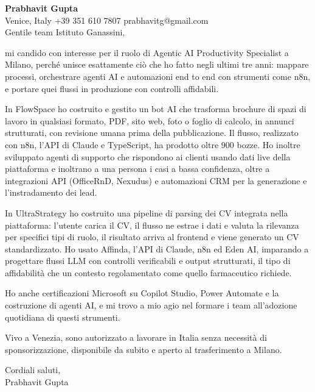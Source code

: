 \documentclass[a4paper,10.5pt]{article}
\begin{document}
\textbf{Prabhavit Gupta}\\
Venice, Italy \textbar{} +39 351 610 7807 \textbar{} prabhavitg@gmail.com\\[10pt]
Gentile team Istituto Ganassini,

mi candido con interesse per il ruolo di Agentic AI Productivity Specialist a Milano, perch\'e unisce esattamente ci\`o che ho fatto negli ultimi tre anni: mappare processi, orchestrare agenti AI e automazioni end to end con strumenti come n8n, e portare quei flussi in produzione con controlli affidabili.

In FlowSpace ho costruito e gestito un bot AI che trasforma brochure di spazi di lavoro in qualsiasi formato, PDF, sito web, foto o foglio di calcolo, in annunci strutturati, con revisione umana prima della pubblicazione. Il flusso, realizzato con n8n, l'API di Claude e TypeScript, ha prodotto oltre 900 bozze. Ho inoltre sviluppato agenti di supporto che rispondono ai clienti usando dati live della piattaforma e inoltrano a una persona i casi a bassa confidenza, oltre a integrazioni API (OfficeRnD, Nexudus) e automazioni CRM per la generazione e l'instradamento dei lead.

In UltraStrategy ho costruito una pipeline di parsing dei CV integrata nella piattaforma: l'utente carica il CV, il flusso ne estrae i dati e valuta la rilevanza per specifici tipi di ruolo, il risultato arriva al frontend e viene generato un CV standardizzato. Ho usato Affinda, l'API di Claude, n8n ed Eden AI, imparando a progettare flussi LLM con controlli verificabili e output strutturati, il tipo di affidabilit\`a che un contesto regolamentato come quello farmaceutico richiede.

Ho anche certificazioni Microsoft su Copilot Studio, Power Automate e la costruzione di agenti AI, e mi trovo a mio agio nel formare i team all'adozione quotidiana di questi strumenti.

Vivo a Venezia, sono autorizzato a lavorare in Italia senza necessit\`a di sponsorizzazione, disponibile da subito e aperto al trasferimento a Milano.

Cordiali saluti,\\
Prabhavit Gupta
\end{document}
